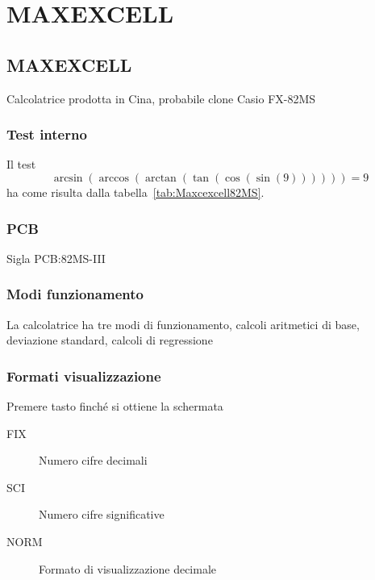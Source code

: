 \chapter{MAXEXCELL}
\section{MAXEXCELL}
Calcolatrice prodotta in Cina, probabile clone Casio FX-82MS
\subsection{Test interno}
Il test\[\arcsin(\arccos(\arctan(\tan(\cos(\sin(9))))))=9\] ha come risulta dalla tabella~\vref{tab:Maxcexcell82MS}. 
\subsection{PCB}
Sigla PCB:82MS-III
\subsection{Modi funzionamento}
La calcolatrice ha tre modi di funzionamento, calcoli aritmetici di base, deviazione standard, calcoli di regressione
\subsection{Formati visualizzazione}
Premere tasto \tastomode finché si ottiene la schermata
\begin{center}
	\CASIOmodediplayexp
	
\end{center}
\begin{description}
	\item[ FIX]Numero cifre decimali
	\item[ SCI]Numero cifre significative
	\item[ NORM]Formato di visualizzazione decimale
\end{description}
